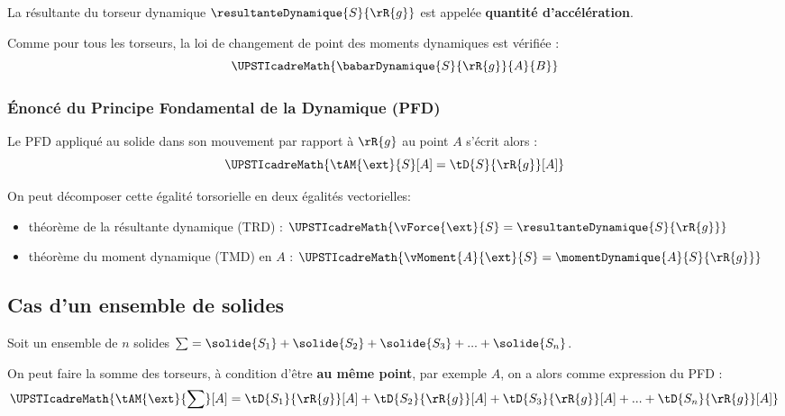 \documentclass[11pt]{article}
\begin{document}
La résultante du torseur dynamique $\resultanteDynamique{S}{\rR{g}}$ est appelée \textbf{quantité d'accélération}.
 
Comme pour tous les torseurs, la loi de changement de point des moments dynamiques est vérifiée : 
\[ \UPSTIcadreMath{\babarDynamique{S}{\rR{g}}{A}{B}} \]

\subsubsection{Énoncé du Principe Fondamental de la Dynamique (PFD)}

\noindent Le PFD appliqué au solide  dans son mouvement par rapport à $\rR{g}$ au point $A$ s'écrit alors : 
\[ \UPSTIcadreMath{\tAM{\ext}{S}[A]=\tD{S}{\rR{g}}[A]} \] 

\noindent On peut décomposer cette égalité torsorielle en deux égalités vectorielles:
\begin{itemize}
\item théorème de la résultante dynamique (TRD) : $\UPSTIcadreMath{\vForce{\ext}{S}=\resultanteDynamique{S}{\rR{g}}}$
\item théorème du moment dynamique (TMD) en $A$ : $\UPSTIcadreMath{\vMoment{A}{\ext}{S}=\momentDynamique{A}{S}{\rR{g}}}$
\end{itemize}


\subsection{Cas d'un ensemble de solides}

Soit un ensemble de $n$ solides $\sum = \solide{S_1}+\solide{S_2}+\solide{S_3}+...+\solide{S_n}$.

On peut faire la somme des torseurs, à condition d'être \textbf{au même point}, par exemple $A$, on a alors comme expression du PFD :
\[ \UPSTIcadreMath{\tAM{\ext}{\sum}[A]=\tD{S_1}{\rR{g}}[A]+\tD{S_2}{\rR{g}}[A]+\tD{S_3}{\rR{g}}[A]+...+\tD{S_n}{\rR{g}}[A]} \] 
\end{document}
